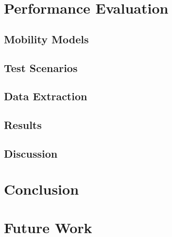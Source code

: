\documentclass[conference]{IEEEtran}
\begin{document}
\section{Performance Evaluation}

\subsection{Mobility Models}

\subsection{Test Scenarios}

\subsection{Data Extraction} 

\subsection{Results}

\subsection{Discussion}

\section{Conclusion}

\section{Future Work}


%
%
\end{document}
